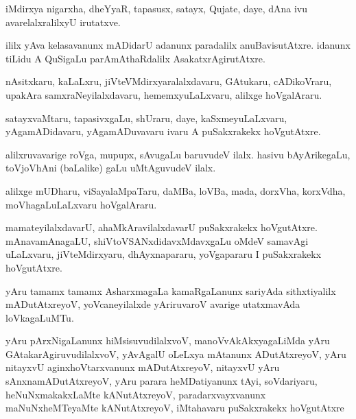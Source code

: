 \documentclass{article}
\begin{document}
\begin{mn}
iMdirxya nigarxha,  dheYyaR,  tapasusx,  satayx,  Qujate,  daye,  dAna  ivu  
avarelalxralilxyU  irutatxve.
\end{mn}

\begin{mn}
ililx  yAva  kelasavanunx  mADidarU  adanunx  paradalilx  anuBavisutAtxre.  
idanunx  tiLidu  A  QuSigaLu  parAmAthaRdalilx  AsakatxrAgirutAtxre.
\end{mn}

\begin{mn}
nAsitxkaru,  kaLaLxru,  jiVteVMdirxyaralalxdavaru,  GAtukaru,  cADikoVraru,  
upakAra samxraNeyilalxdavaru,  hememxyuLaLxvaru,  alilxge  hoVgalAraru.
\end{mn}

\begin{mn}
satayxvaMtaru,  tapasivxgaLu,  shUraru,  daye,  kaSxmeyuLaLxvaru,  
yAgamADidavaru,  yAgamADuvavaru  ivaru  A  puSakxrakekx  hoVgutAtxre.
\end{mn}

\begin{mn}
alilxruvavarige  roVga,  mupupx,  sAvugaLu  baruvudeV  ilalx.  hasivu  
bAyArikegaLu,  toVjoVhAni (baLalike) gaLu  uMtAguvudeV  ilalx.
\end{mn}

\begin{mn}
alilxge  mUDharu,  viSayalaMpaTaru,  daMBa,  loVBa,  mada,  dorxVha,  
korxVdha,  moVhagaLuLaLxvaru  hoVgalAraru.
\end{mn}

\begin{mn}
mamateyilalxdavarU,  ahaMkAravilalxdavarU  puSakxrakekx  hoVgutAtxre.  
mAnavamAnagaLU,  shiVtoVSANxdidavxMdavxgaLu  oMdeV  samavAgi uLaLxvaru,  
jiVteMdirxyaru,  dhAyxnapararu,  yoVgapararu  I  puSakxrakekx  hoVgutAtxre.
\end{mn}

\begin{mn}
yAru  tamamx  tamamx  AsharxmagaLa  kamaRgaLanunx  sariyAda  sithxtiyalilx  
mADutAtxreyoV,  yoVcaneyilalxde  yAriruvaroV  avarige  utatxmavAda  loVkagaLuMTu.
\end{mn}

\begin{mn}
yAru  pArxNigaLanunx  hiMsisuvudilalxvoV,  manoVvAkAkxyagaLiMda  yAru  
GAtakarAgiruvudilalxvoV,  yAvAgalU  oLeLxya  mAtanunx  ADutAtxreyoV,  
yAru  nitayxvU  aginxhoVtarxvanunx  mADutAtxreyoV,  nitayxvU  yAru  
sAnxnamADutAtxreyoV,  yAru  parara  heMDatiyanunx  tAyi,  soVdariyaru,  
heNuNxmakakxLaMte  kANutAtxreyoV,  paradarxvayxvanunx  maNuNxheMTeyaMte  
kANutAtxreyoV,  iMtahavaru  puSakxrakekx  hoVgutAtxre
\end{mn}
\end{document}
